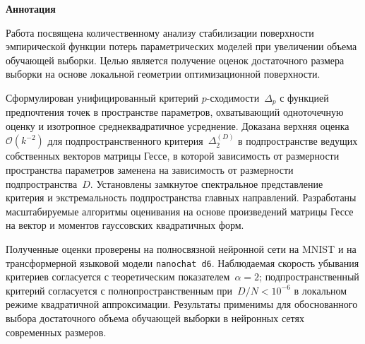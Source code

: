 \begin{center}
    \Large{\textbf{Аннотация}}
\end{center}

Работа посвящена количественному анализу стабилизации поверхности эмпирической функции потерь параметрических моделей при увеличении объема обучающей выборки. Целью является получение оценок достаточного размера выборки на основе локальной геометрии оптимизационной поверхности.

Сформулирован унифицированный критерий $p$-сходимости~$\Delta_p$ с функцией предпочтения точек в пространстве параметров, охватывающий одноточечную оценку и изотропное среднеквадратичное усреднение. Доказана верхняя оценка~$\mathcal O(k^{-2})$ для подпространственного критерия~$\Delta_2^{(D)}$ в подпространстве ведущих собственных векторов матрицы Гессе, в которой зависимость от размерности пространства параметров заменена на зависимость от размерности подпространства~$D$. Установлены замкнутое спектральное представление критерия и экстремальность подпространства главных направлений. Разработаны масштабируемые алгоритмы оценивания на основе произведений матрицы Гессе на вектор и моментов гауссовских квадратичных форм.

Полученные оценки проверены на полносвязной нейронной сети на MNIST и на трансформерной языковой модели \texttt{nanochat d6}. Наблюдаемая скорость убывания критериев согласуется с теоретическим показателем~$\alpha = 2$; подпространственный критерий согласуется с полнопространственным при~$D/N < 10^{-6}$ в локальном режиме квадратичной аппроксимации. Результаты применимы для обоснованного выбора достаточного объема обучающей выборки в нейронных сетях современных размеров.
